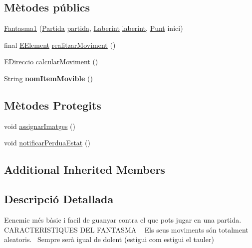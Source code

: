 \subsection*{Mètodes públics}
\begin{DoxyCompactItemize}
\item 
\hyperlink{classlogica_1_1_fantasma1_aee9773a1f660ba8c36da59caa79b36e9}{Fantasma1} (\hyperlink{classlogica_1_1_partida}{Partida} \hyperlink{classlogica_1_1_item_movible_ace55b4918a7f671f89ed3109c91359e4}{partida}, \hyperlink{classlogica_1_1laberints_1_1_laberint}{Laberint} \hyperlink{classlogica_1_1_item_movible_a97036130b7376d77776427ca126f6fb5}{laberint}, \hyperlink{classlogica_1_1_punt}{Punt} inici)
\item 
final \hyperlink{enumlogica_1_1enumeracions_1_1_e_element}{E\+Element} \hyperlink{classlogica_1_1_fantasma1_aedd0d00456866065de043652fc783c68}{realitzar\+Moviment} ()
\item 
\hyperlink{enumlogica_1_1enumeracions_1_1_e_direccio}{E\+Direccio} \hyperlink{classlogica_1_1_fantasma1_ac0020a6fef6ca6779711c58f04d993fc}{calcular\+Moviment} ()
\item 
\hypertarget{classlogica_1_1_fantasma1_ac013f39eb8452049f1c4449bd414fd79}{String {\bfseries nom\+Item\+Movible} ()}\label{classlogica_1_1_fantasma1_ac013f39eb8452049f1c4449bd414fd79}

\end{DoxyCompactItemize}
\subsection*{Mètodes Protegits}
\begin{DoxyCompactItemize}
\item 
void \hyperlink{classlogica_1_1_fantasma1_a4e887e1e0151f5fd35a202b323879bb1}{assignar\+Imatges} ()
\item 
void \hyperlink{classlogica_1_1_fantasma1_affe46017be82b1f54e68c41364a69fe3}{notificar\+Perdua\+Estat} ()
\end{DoxyCompactItemize}
\subsection*{Additional Inherited Members}


\subsection{Descripció Detallada}
Eenemic més bàsic i facil de guanyar contra el que pots jugar en una partida.~\newline
~\newline
C\+A\+R\+A\+C\+T\+E\+R\+I\+S\+T\+I\+Q\+U\+E\+S D\+E\+L F\+A\+N\+T\+A\+S\+M\+A ~\newline
Els seus moviments són totalment aleatoris.~\newline
Sempre serà igual de dolent (estigui com estigui el tauler) 

